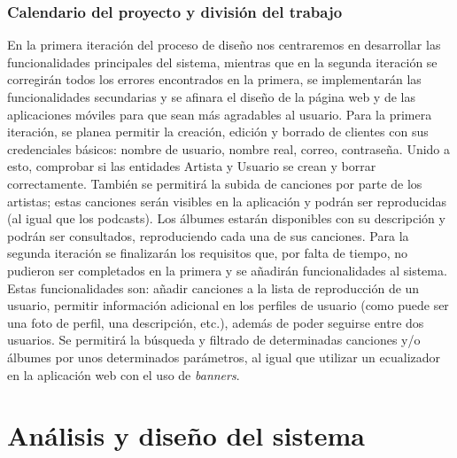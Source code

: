 \documentclass{article}
\begin{document}
\subsubsection{Calendario del proyecto y división del trabajo}
En la primera iteración del proceso de diseño nos centraremos en desarrollar las funcionalidades principales del sistema, mientras que en la segunda iteración se corregirán todos los errores encontrados en la primera, se implementarán las funcionalidades secundarias y se afinara el diseño de la página web y de las aplicaciones móviles para que sean más agradables al usuario. 
\hfill \break
Para la primera iteración, se planea permitir la creación, edición y borrado de clientes con sus credenciales básicos: nombre de usuario, nombre real, correo, contraseña. Unido a esto, comprobar si las entidades Artista y Usuario se crean y borrar correctamente.  También se permitirá la subida de canciones por parte de los artistas; estas canciones serán visibles en la aplicación y podrán ser reproducidas (al igual que los podcasts). Los álbumes estarán disponibles con su descripción y podrán ser consultados, reproduciendo cada una de sus canciones.
\hfill \break
Para la segunda iteración se finalizarán los requisitos que, por falta de tiempo, no pudieron ser completados en la primera y se añadirán funcionalidades al sistema. Estas funcionalidades son: añadir canciones a la lista de reproducción de un usuario, permitir información adicional en los perfiles de usuario (como puede ser una foto de perfil, una descripción, etc.), además de poder seguirse entre dos usuarios. Se permitirá la búsqueda y filtrado de determinadas canciones y/o álbumes por unos determinados parámetros, al igual que utilizar un ecualizador en la aplicación web con el uso de \textit{banners}.


\newpage
\section{Análisis y diseño del sistema}
\end{document}
